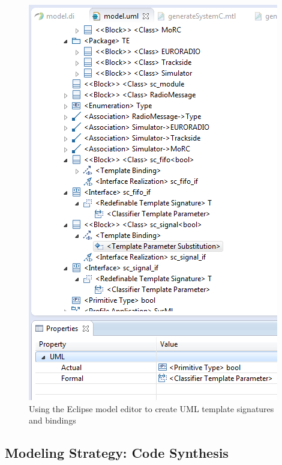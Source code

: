 \documentclass{template/openetcs_article}
\begin{document}
\begin{figure}
\begin{center}
\includegraphics[scale=1]{figures/template_binding}
\end{center}
\caption{Using the Eclipse model editor to create UML template signatures and bindings}
\label{fig:eclipseTemplates}
\end{figure}

\subsection{Modeling Strategy: Code Synthesis}
\end{document}
